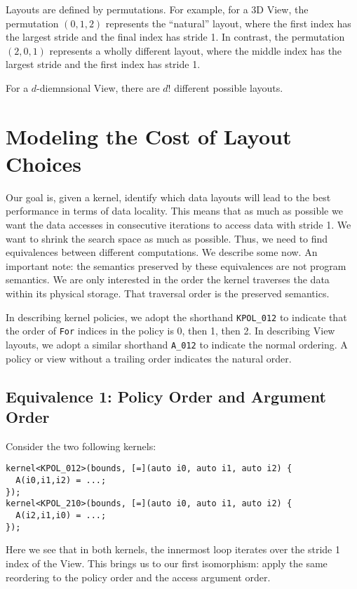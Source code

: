 \documentclass{article}
\begin{document}
Layouts are defined by permutations. 
For example, for a 3D View, the permutation $(0,1,2)$ represents the \enquote{natural} layout, where the first index has the largest stride and the final index has stride 1.
In contrast, the permutation $(2,0,1)$ represents a wholly different layout, where the middle index has the largest stride and the first index has stride 1. 

For a $d$-diemnsional View, there are $d!$ different possible layouts.

\section{Modeling the Cost of Layout Choices}

Our goal is, given a kernel, identify which data layouts will lead to the best performance in terms of data locality. 
This means that as much as possible we want the data accesses in consecutive iterations to access data with stride 1. 
We want to shrink the search space as much as possible. 
Thus, we need to find equivalences between different computations. 
We describe some now.
An important note: the semantics preserved by these equivalences are not program semantics. 
We are only interested in the order the kernel traverses the data within its physical storage. 
That traversal order is the preserved semantics.

In describing kernel policies, we adopt the shorthand \verb.KPOL_012. to indicate that the order of \verb.For. indices in the policy is 0, then 1, then 2. 
In describing View layouts, we adopt a similar shorthand \verb.A_012. to indicate the normal ordering.
A policy or view without a trailing order indicates the natural order. 

\subsection{Equivalence 1: Policy Order and Argument Order}

Consider the two following kernels:
\begin{lstlisting}
kernel<KPOL_012>(bounds, [=](auto i0, auto i1, auto i2) {
  A(i0,i1,i2) = ...;
});
kernel<KPOL_210>(bounds, [=](auto i0, auto i1, auto i2) {
  A(i2,i1,i0) = ...;
});
\end{lstlisting}
Here we see that in both kernels, the innermost loop iterates over the stride 1 index of the View. 
This brings us to our first isomorphism: apply the same reordering to the policy order and the access argument order. 
\end{document}
